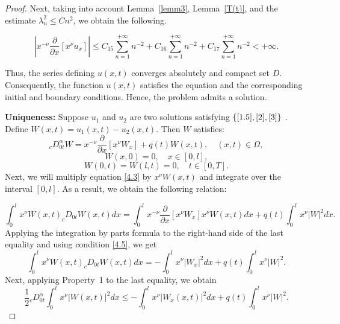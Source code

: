\documentclass[reqno]{amsart}
\theoremstyle{definition}
\numberwithin{equation}{section}
\begin{document}
\begin{proof}
Next, taking into account Lemma~\ref{lemm3}, Lemma~\ref{T(t)}, and the estimate $\lambda_n^2 \leq C n^2$, we obtain the following.


\begin{equation*}
\left|x^{-\nu}\dfrac{\partial}{\partial x}\left[x^{\nu}u_x\right]\right|\leq C_{15}\sum_{n=1}^{+\infty}n^{-2}+C_{16}\sum_{n=1}^{+\infty}n^{-2}+C_{17}\sum_{n=1}^{+\infty}n^{-2}<+\infty.
\end{equation*}

Thus, the series defining $u(x,t)$ converges absolutely and compact set $D$. Consequently, the function $u(x,t)$ satisfies the equation and the corresponding initial and boundary conditions. Hence, the problem admits a solution. 



\textbf{Uniqueness:} Suppose $u_1$ and $u_2$ are two solutions satisfying $\{\eqref{1.5},\eqref{2},\eqref{3}\}$ . Define $W(x, t)=u_1(x, t)-u_2(x, t)$. Then $W$ satisfies:
\begin{equation}\label{4.3}
    _cD_{0t}^{\alpha}W =x^{-\nu}\frac{\partial}{\partial x}\left[x^\nu W_x\right]+q(t)W(x,t), \quad(x, t) \in \Omega,
\end{equation}
\begin{equation}
    W(x, 0)  =0, \quad x \in [0,l],
\end{equation}
\begin{equation}\label{4.5}
    W(0, t)  =W(l, t)=0, \quad t \in[0, T] .
\end{equation}
Next, we will multiply equation \eqref{4.3} by $x^{\nu} W(x,t)$ and integrate over the interval $[0,l]$. As a result, we obtain the following relation:

\begin{equation*}
    \int_0^l x^{\nu}W(x,t)_cD_{0t}W(x,t)dx=\int_0^l x^{-\nu}\frac{\partial}{\partial x}\left[x^\nu W_x\right]x^{\nu}W(x,t)dx+q(t)\int_0^lx^{\nu}|W|^2dx.
\end{equation*}
Applying the integration by parts formula to the right-hand side of the last equality and using condition \eqref{4.5}, we get 
\begin{equation*}
    \int_0^l x^{\nu}W(x,t)_cD_{0t}W(x,t)dx=-\int_0^lx^{\nu}\left|W_x\right|^2dx+q(t)\int_0^lx^{\nu}|W|^2.
\end{equation*}
 Next, applying Property~1 to the last equality, we obtain
\begin{equation*}
    \frac{1}{2} {_c}D_{0t}^{\alpha}\int_0^lx^{\nu}|W(x,t)|^2dx\le-\int_0^lx^{\nu}\left|W_{x}(x,t)\right|^2dx+q(t)\int_0^lx^{\nu}|W|^2.
\end{equation*}





\end{proof}
\end{document}
